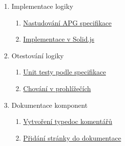 \begin{enumerate}[label=\arabic*.]
\begin{enumerate}[label*=\arabic*.]
                        \begin{enumerate}[label*=\arabic*.]
                              \item Implementace logiky
                                    \begin{enumerate}[label*=\arabic*.]
                                          \item \ul{Nastudování APG specifikace}
                                          \item \ul{Implementace v Solid.js}
                                    \end{enumerate}
                              \item Otestování logiky
                                    \begin{enumerate}[label*=\arabic*.]
                                          \item \ul{Unit testy podle specifikace}
                                          \item \ul{Chování v prohlížečích}
                                    \end{enumerate}
                              \item Dokumentace komponent
                                    \begin{enumerate}[label*=\arabic*.]
                                          \item \ul{Vytvoření typedoc komentářů}
                                          \item \ul{Přidání stránky do dokumentace}
                                    \end{enumerate}
                        \end{enumerate}
            \end{enumerate}
\end{enumerate}
